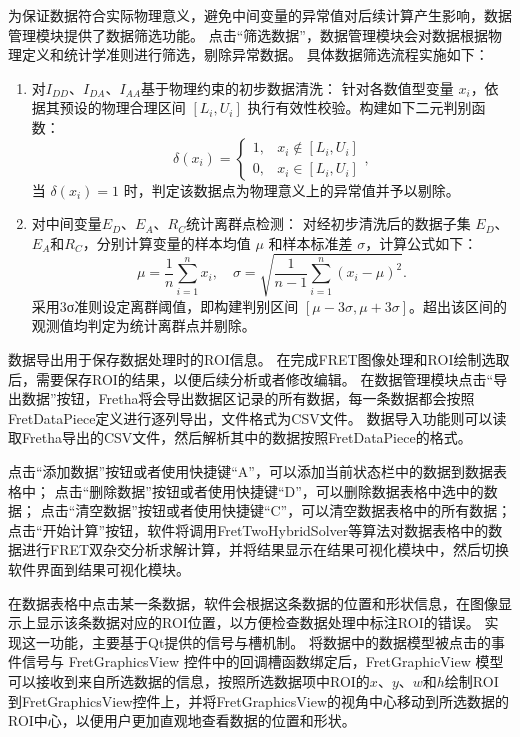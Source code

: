 为保证数据符合实际物理意义，避免中间变量的异常值对后续计算产生影响，数据管理模块提供了数据筛选功能。
点击“筛选数据”，数据管理模块会对数据根据物理定义和统计学准则进行筛选，剔除异常数据。
具体数据筛选流程实施如下：
\begin{enumerate}
  \item 对$I_{DD}$、$I_{DA}$、$I_{AA}$基于物理约束的初步数据清洗：
    针对各数值型变量 \( x_i \)，依据其预设的物理合理区间 \( [L_i, U_i] \) 执行有效性校验。构建如下二元判别函数：
    \begin{equation}
      \delta(x_i) = 
      \begin{cases} 
        1, & x_i \notin [L_i, U_i]  \\
        0, & x_i \in [L_i, U_i]
      \end{cases} ,
    \end{equation}
    当 \( \delta(x_i) = 1 \) 时，判定该数据点为物理意义上的异常值并予以剔除。
  \item 对中间变量$E_D$、$E_A$、$R_C$统计离群点检测：
    对经初步清洗后的数据子集 \( E_D \)、\( E_A \)和$R_C$，分别计算变量的样本均值 \( \mu \) 和样本标准差 \( \sigma \)，计算公式如下：
    \begin{equation}
      \mu = \frac{1}{n}\sum_{i=1}^n x_i, \quad \sigma = \sqrt{\frac{1}{n - 1}\sum_{i=1}^n (x_i - \mu)^2}.
    \end{equation}
    采用3σ准则设定离群阈值，即构建判别区间 \( [\mu - 3\sigma, \mu + 3\sigma] \)。超出该区间的观测值均判定为统计离群点并剔除。
\end{enumerate}

数据导出用于保存数据处理时的ROI信息。
在完成FRET图像处理和ROI绘制选取后，需要保存ROI的结果，以便后续分析或者修改编辑。
在数据管理模块点击“导出数据”按钮，Fretha将会导出数据区记录的所有数据，每一条数据都会按照FretDataPiece定义进行逐列导出，文件格式为CSV文件。
数据导入功能则可以读取Fretha导出的CSV文件，然后解析其中的数据按照FretDataPiece的格式。

点击“添加数据”按钮或者使用快捷键“A”，可以添加当前状态栏中的数据到数据表格中；
点击“删除数据”按钮或者使用快捷键“D”，可以删除数据表格中选中的数据；
点击“清空数据”按钮或者使用快捷键“C”，可以清空数据表格中的所有数据；
点击“开始计算”按钮，软件将调用FretTwoHybridSolver等算法对数据表格中的数据进行FRET双杂交分析求解计算，并将结果显示在结果可视化模块中，然后切换软件界面到结果可视化模块。

在数据表格中点击某一条数据，软件会根据这条数据的位置和形状信息，在图像显示上显示该条数据对应的ROI位置，以方便检查数据处理中标注ROI的错误。
实现这一功能，主要基于Qt提供的信号与槽机制。
将数据中的数据模型被点击的事件信号与 FretGraphicsView 控件中的回调槽函数绑定后，FretGraphicView 模型可以接收到来自所选数据的信息，按照所选数据项中ROI的$x$、$y$、$w$和$h$绘制ROI到FretGraphicsView控件上，并将FretGraphicsView的视角中心移动到所选数据的ROI中心，以便用户更加直观地查看数据的位置和形状。

